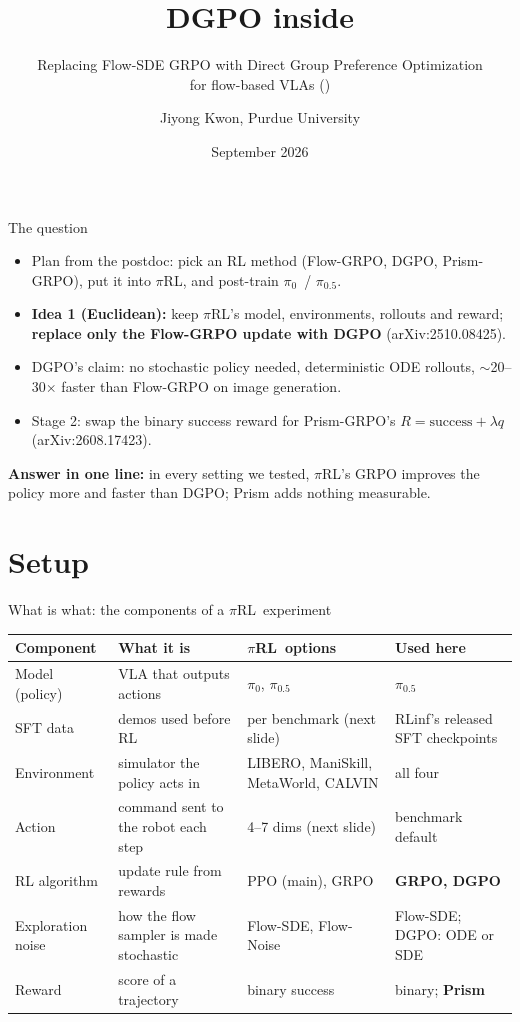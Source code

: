 \documentclass[aspectratio=169,11pt]{beamer}
\title{DGPO inside \pirl}
\subtitle{Replacing Flow-SDE GRPO with Direct Group Preference Optimization\\for flow-based VLAs (\pifive)}
\author{Jiyong Kwon, Purdue University}
\date{September 2026}
\newcommand{\pirl}{$\pi$RL}
\newcommand{\pizero}{$\pi_0$}
\newcommand{\pifive}{$\pi_{0.5}$}
\begin{document}
\begin{frame}
  \titlepage
\end{frame}

\begin{frame}{The question}
  \begin{itemize}
    \item Plan from the postdoc: pick an RL method (Flow-GRPO, DGPO, Prism-GRPO),
          put it into \pirl, and post-train \pizero\ / \pifive.
    \item \textbf{Idea 1 (Euclidean):} keep \pirl's model, environments, rollouts and reward;
          \textbf{replace only the Flow-GRPO update with DGPO} (arXiv:2510.08425).
    \item DGPO's claim: no stochastic policy needed, deterministic ODE rollouts,
          $\sim$20--30$\times$ faster than Flow-GRPO on image generation.
    \item Stage 2: swap the binary success reward for Prism-GRPO's
          $R = \text{success} + \lambda q$ (arXiv:2608.17423).
  \end{itemize}
  \vspace{0.6em}
  \textbf{Answer in one line:} in every setting we tested, \pirl's GRPO improves the policy
  more and faster than DGPO; Prism adds nothing measurable.
\end{frame}

\section{Setup}
\begin{frame}{What is what: the components of a \pirl\ experiment}
  \small
  \begin{tabularx}{\linewidth}{@{}l Y Y Y@{}}
    \toprule
    Component & What it is & \pirl\ options & \textbf{Used here} \\
    \midrule
    Model (policy) & VLA that outputs actions & \pizero, \pifive & \textbf{\pifive} \\
    SFT data & demos used before RL & per benchmark (next slide) & RLinf's released SFT checkpoints \\
    Environment & simulator the policy acts in & LIBERO, ManiSkill, MetaWorld, CALVIN & all four \\
    Action & command sent to the robot each step & 4--7 dims (next slide) & benchmark default \\
    RL algorithm & update rule from rewards & PPO (main), GRPO & \textbf{GRPO, DGPO} \\
    Exploration noise & how the flow sampler is made stochastic & Flow-SDE, Flow-Noise & Flow-SDE; DGPO: ODE or SDE \\
    Reward & score of a trajectory & binary success & binary; \textbf{Prism} \\
    \bottomrule
  \end{tabularx}
\end{frame}
\end{document}
